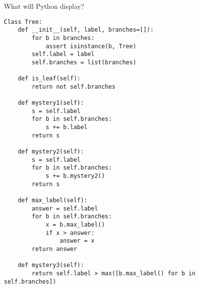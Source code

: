 \begin{blocksection}
\question What will Python display?

\begin{lstlisting}
Class Tree:
    def __init__(self, label, branches=[]):
        for b in branches:
            assert isinstance(b, Tree)
        self.label = label
        self.branches = list(branches)

    def is_leaf(self):
        return not self.branches

    def mystery1(self):
        s = self.label
        for b in self.branches:
            s += b.label
        return s

    def mystery2(self):
        s = self.label
        for b in self.branches:
            s += b.mystery2()
        return s

    def max_label(self):
        answer = self.label
        for b in self.branches:
            x = b.max_label()
            if x > answer:
                answer = x
        return answer

    def mystery3(self):
        return self.label > max([b.max_label() for b in self.branches])
\end{lstlisting}
\end{blocksection}

